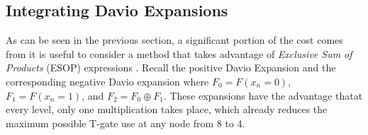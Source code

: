 \documentclass[paper]{ieice}
\providecommand{\DIFadd}[1]{{\protect\color{blue}{#1}}} %
\providecommand{\DIFaddbegin}{} %
\providecommand{\DIFaddend}{} %
\newcommand{\DIFaddincludegraphics}[2][]{{\color{blue}\fbox{\DIFOincludegraphics[#1]{#2}}}} %
\DeclareRobustCommand{\DIFaddbegin}{\DIFOaddbegin \let\includegraphics\DIFaddincludegraphics} %
\DeclareRobustCommand{\DIFaddend}{\DIFOaddend \let\includegraphics\DIFOincludegraphics} %
\begin{document}
\subsection{Integrating Davio Expansions}
\label{Subsec:davio}
As can be seen in the previous section, a significant portion of the cost comes from  \DIFaddbegin \DIFadd{Boolean multiplication.
(For the remainder of this paper, we will refer to }\emph{\DIFadd{Boolean multiplication}} \DIFadd{simply as multiplication)
Therefore, }\DIFaddend it is useful to consider a method that takes advantage of {\it Exclusive Sum of Products} (ESOP)
expressions \DIFaddbegin \DIFadd{to reduce this multiplication cost }\DIFaddend . Recall the positive Davio Expansion  \DIFaddbegin \DIFadd{$F=F_0\oplus x_n \cdot F_2$ }\DIFaddend and the corresponding
negative Davio expansion  \DIFaddbegin \DIFadd{$F=F_1 \oplus \overline{x_n} \cdot F_2$ }\DIFaddend where $F_0 = F(x_n=0)$,$F_1 = F(x_n=1)$,
and $F_2 = F_0 \oplus F_1$. These expansions have the advantage that\DIFaddbegin \DIFadd{, }\DIFaddend at every level, only one
multiplication takes place, which already reduces the maximum possible T-gate use at any node from
8 to 4. 
\end{document}
